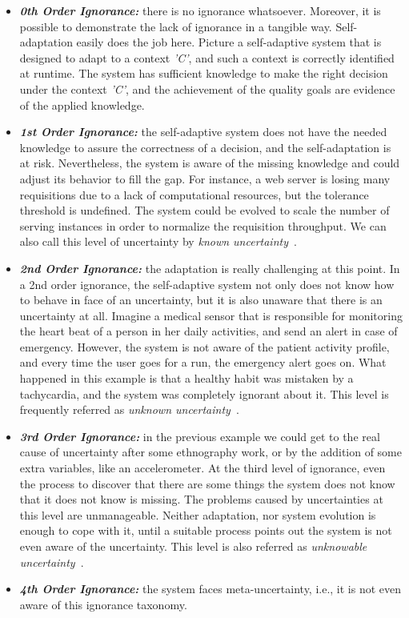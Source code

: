 \begin{itemize}
	\item \textbf{\textit{0th Order Ignorance:}} there is no ignorance whatsoever. Moreover, it is possible to demonstrate the lack of ignorance in a tangible way. Self-adaptation easily does the job here. Picture a self-adaptive system that is designed to adapt to a context \textit{'C'}, and such a context is correctly identified at runtime. The system has sufficient knowledge to make the right decision under the context \textit{'C'}, and the achievement of the quality goals are evidence of the applied knowledge.
	
	\item \textbf{\textit{1st Order Ignorance:}} the self-adaptive system does not have the needed knowledge to assure the correctness of a decision, and the self-adaptation is at risk. Nevertheless, the system is aware of the missing knowledge and could adjust its behavior to fill the gap. For instance, a web server is losing many requisitions due to a lack of computational resources, but the tolerance threshold is undefined. The system could be evolved to scale the number of serving instances in order to normalize the requisition throughput. We can also call this level of uncertainty by \textit{known uncertainty}~\cite{chow2002known}.
	
	\item \textbf{\textit{2nd Order Ignorance:}} the adaptation is really challenging at this point. In a 2nd order ignorance, the self-adaptive system not only does not know how to behave in face of an uncertainty, but it is also unaware that there is an uncertainty at all. Imagine a medical sensor that is responsible for monitoring the heart beat of a person in her daily activities, and send an alert in case of emergency. However, the system is not aware of the patient activity profile, and every time the user goes for a run, the emergency alert goes on. What happened in this example is that a healthy habit was mistaken by a tachycardia, and the system was completely ignorant about it. This level is frequently referred as \textit{unknown uncertainty}~\cite{chow2002known}.
	
	\item \textbf{\textit{3rd Order Ignorance:}} in the previous example we could get to the real cause of uncertainty after some ethnography work, or by the addition of some extra variables, like an accelerometer. At the third level of ignorance, even the process to discover that there are some things the system does not know that it does not know is missing. The problems caused by uncertainties at this level are unmanageable. Neither adaptation, nor system evolution is enough to cope with it, until a suitable process points out the system is not even aware of the uncertainty. This level is also referred as \textit{unknowable uncertainty}~\cite{chow2002known}.
	
	\item \textbf{\textit{4th Order Ignorance:}} the system faces meta-uncertainty, i.e., it is not even aware of this ignorance taxonomy.
	
\end{itemize}	

